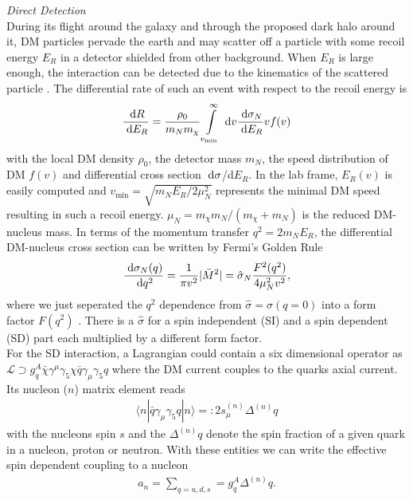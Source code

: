 \textit{Direct Detection} \\
During its flight around the galaxy and through the proposed dark halo around it, DM particles pervade the earth and may scatter off a particle 
with some recoil energy $E_R$ in a detector shielded from other background. When $E_R$ is large enough, the interaction can be detected due to
the kinematics of the scattered particle \cite{GoodmanWitten}. The differential rate of such an event with respect to the recoil energy is
\cite{1002.1912}
\begin{align}
 \frac{\; \mathrm{d} R}{\; \mathrm{d} E_R} = \frac{\rho_0}{m_N m_\chi}\int\limits_{v_\text{min}}^\infty \; \mathrm{d} v \frac{\; \mathrm{d} \sigma_N}{\; \mathrm{d} E_R} v f(v)
\end{align}
with the local DM density $\rho_0$, the detector mass $m_N$, the speed distribution of DM $f(v)$ \cite{1312.0273} and differential cross section $\; \mathrm{d}\sigma$/d$E_R$.
In the lab frame, $E_R(v)$ is easily computed and $v_\text{min} =\sqrt{m_NE_R/2\mu^2_N}$ represents the minimal DM speed resulting in such a recoil 
energy. $\mu_N = m_\chi m_N /(m_\chi+m_N)$ is the reduced DM-nucleus mass. In terms of the momentum transfer $q^2=2m_NE_R$, the differential
DM-nucleus cross section can be written by Fermi's Golden Rule 
\begin{align}
 \frac{\; \mathrm{d} \sigma_N(q)}{\; \mathrm{d} q^2} = \frac{1}{\pi v^2} |\bar{M}^2| = \hat{\sigma}_N \frac{F^2(q^2)}{4\mu_N^2 v^2},
\end{align}
where we just seperated the $q^2$ dependence from $\hat{\sigma} = \sigma(q=0)$ into a form factor $F(q^2)$ \cite{0608035}. There is a 
$\hat{\sigma}$ for a spin independent (SI) and a spin dependent (SD) part each multiplied by a different form factor. \\
\noindent For the SD interaction,
a Lagrangian could contain a six dimensional operator as $\mathcal{L} \supset g_q^A\bar \chi \gamma^\mu\gamma_5 \chi \bar q \gamma_\mu\gamma_5 q$
where the DM current couples to the quarks axial current. Its nucleon ($n$) matrix element reads
\begin{align}
 \langle n |\bar q \gamma_\mu \gamma_5 q|n\rangle =: 2 s_\mu^{(n)} \Delta^{(n)} q
\end{align}
with the nucleons spin $s$ and the $\Delta^{(n)}q$ denote the spin fraction of a given quark in a nucleon, proton or neutron. With these entities
we can write the effective spin dependent coupling to a nucleon
\begin{align}
 a_n = \sum\limits_{q=u,d,s} = g_q^A \Delta^{(n)}q.
\end{align}
